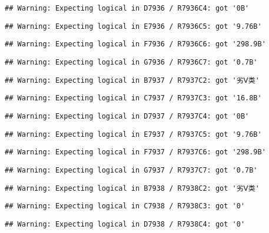 \documentclass[
]{article}
\begin{document}
\begin{verbatim}
## Warning: Expecting logical in D7936 / R7936C4: got '0B'
\end{verbatim}

\begin{verbatim}
## Warning: Expecting logical in E7936 / R7936C5: got '9.76B'
\end{verbatim}

\begin{verbatim}
## Warning: Expecting logical in F7936 / R7936C6: got '298.9B'
\end{verbatim}

\begin{verbatim}
## Warning: Expecting logical in G7936 / R7936C7: got '0.7B'
\end{verbatim}

\begin{verbatim}
## Warning: Expecting logical in B7937 / R7937C2: got '劣Ⅴ类'
\end{verbatim}

\begin{verbatim}
## Warning: Expecting logical in C7937 / R7937C3: got '16.8B'
\end{verbatim}

\begin{verbatim}
## Warning: Expecting logical in D7937 / R7937C4: got '0B'
\end{verbatim}

\begin{verbatim}
## Warning: Expecting logical in E7937 / R7937C5: got '9.76B'
\end{verbatim}

\begin{verbatim}
## Warning: Expecting logical in F7937 / R7937C6: got '298.9B'
\end{verbatim}

\begin{verbatim}
## Warning: Expecting logical in G7937 / R7937C7: got '0.7B'
\end{verbatim}

\begin{verbatim}
## Warning: Expecting logical in B7938 / R7938C2: got '劣Ⅴ类'
\end{verbatim}

\begin{verbatim}
## Warning: Expecting logical in C7938 / R7938C3: got '0'
\end{verbatim}

\begin{verbatim}
## Warning: Expecting logical in D7938 / R7938C4: got '0'
\end{verbatim}
\end{document}
